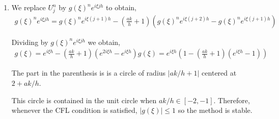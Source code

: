 \documentclass[10pt]{article}
\begin{document}
\begin{solution}[Solution]
\begin{enumerate}[label=(\alph*)]
    \item We replace \( U_j^{n} \) by \( g(\xi)^n e^{i\xi j h} \) to obtain,
        \begin{align*}
            g(\xi)^ne^{i\xi j h} = g(\xi)^n e^{i\xi(j+1)h} - \left( \frac{ak}{h} + 1 \right) \left( g(\xi)^n e^{i\xi(j+2)h} - g(\xi)^n e^{i\xi(j+1)h} \right)
        \end{align*}
       
        Dividing by \( g(\xi)^ne^{i\xi j h} \) we obtain,
        \begin{align*}
            g(\xi) = e^{i\xi h} - \left( \frac{ak}{h} + 1 \right) \left( e^{2i\xi h} - e^{i\xi h} \right)
            g(\xi) = e^{i\xi h}\left(1 - \left( \frac{ak}{h} + 1 \right) \left( e^{i\xi h} - 1 \right) \right)
        \end{align*}
        
        The part in the parenthesis is is a circle of radius \( |ak/h+1| \) centered at \( 2 + ak/h \).

        This circle is contained in the unit circle when \( ak/h \in[-2,-1] \). Therefore, whenever the CFL condition is satisfied, \( |g(\xi)| \leq 1 \) so the method is stable.

\end{enumerate}
\end{solution}
\end{document}
